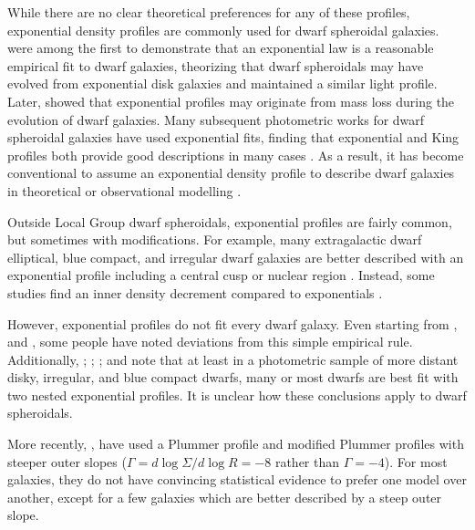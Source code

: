 While there are no clear theoretical preferences for any of these
profiles, exponential density profiles are commonly used for dwarf
spheroidal galaxies. \citet{faber+lin1983} were among the first to
demonstrate that an exponential law is a reasonable empirical fit to
dwarf galaxies, theorizing that dwarf spheroidals may have evolved from
exponential disk galaxies and maintained a similar light profile. Later,
\citet{read+gilmore2005} showed that exponential profiles may originate
from mass loss during the evolution of dwarf galaxies. Many subsequent
photometric works for dwarf spheroidal galaxies have used exponential
fits, finding that exponential and King profiles both provide good
descriptions in many cases
\citep{binggeli+sandage+tarenghi1984, mateo1998, mcconnachie+irwin2006, cicuendez+2018}.
As a result, it has become conventional to assume an exponential density
profile to describe dwarf galaxies in theoretical or observational
modelling
\citep[e.g.,][]{martin+2016, MV2020a, battaglia+2022, kowalczyk+2013}.

Outside Local Group dwarf spheroidals, exponential profiles are fairly
common, but sometimes with modifications. For example, many
extragalactic dwarf elliptical, blue compact, and irregular dwarf
galaxies are better described with an exponential profile including a
central cusp or nuclear region \citep{caldwell+bothun1987, noeske+2003}.
Instead, some studies find an inner density decrement compared to
exponentials \citep[e.g.,][]{caldwell+1992, makarov+2012}.

However, exponential profiles do not fit every dwarf galaxy. Even
starting from \citet{aparicio+1997}, and \citet[for Coma cluster dwarf
ellipticals]{graham+guzman2003}, some people have noted deviations from
this simple empirical rule. Additionally, \citet{hunter+elmegreen2006};
\citet{herrmann+hunter+elmegreen2013};
\citet{herrmann+hunter+elmegreen2016}; and \citet{lee+2018} note that at
least in a photometric sample of more distant disky, irregular, and blue
compact dwarfs, many or most dwarfs are best fit with two nested
exponential profiles. It is unclear how these conclusions apply to dwarf
spheroidals.

More recently, \citet{moskowitz+walker2020}, have used a Plummer profile
and modified Plummer profiles with steeper outer slopes
(\(\Gamma = d\log \Sigma / d \log R = -8\) rather than \(\Gamma = -4\)).
For most galaxies, they do not have convincing statistical evidence to
prefer one model over another, except for a few galaxies which are
better described by a steep outer slope.

